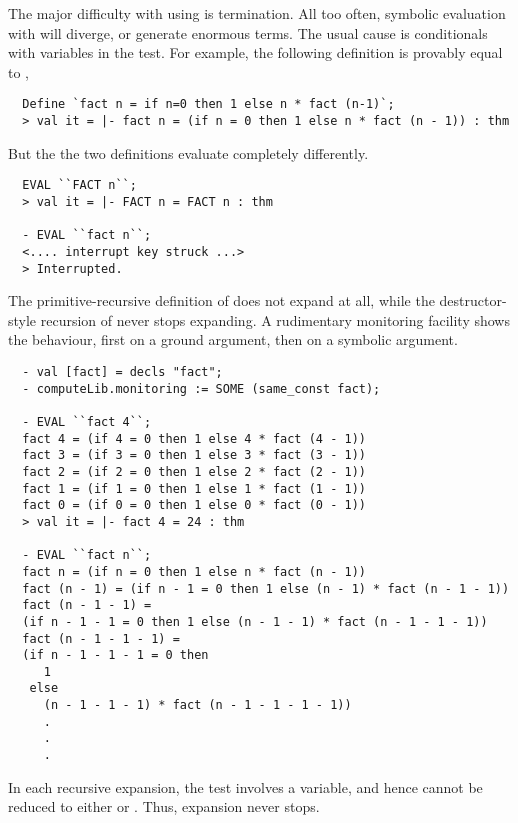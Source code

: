 {The major difficulty with using  is termination. All too
often, symbolic evaluation with  will diverge, or generate
enormous terms. The usual cause is conditionals with variables in the
test. For example, the following definition is provably equal to ,
%
\begin{session}
\begin{hol}
\begin{verbatim}
  Define `fact n = if n=0 then 1 else n * fact (n-1)`;
  > val it = |- fact n = (if n = 0 then 1 else n * fact (n - 1)) : thm
\end{verbatim}
\end{hol}
\end{session}
%
But the the two definitions evaluate completely differently.
%
\begin{session}
\begin{hol}
\begin{verbatim}
  EVAL ``FACT n``;
  > val it = |- FACT n = FACT n : thm

  - EVAL ``fact n``;
  <.... interrupt key struck ...>
  > Interrupted.
\end{verbatim}
\end{hol}
\end{session}
%
The primitive-recursive definition of  does not expand
at all, while the destructor-style recursion of  never stops
expanding. A rudimentary monitoring facility shows the behaviour, first
on a ground argument, then on a symbolic argument.
%
\begin{session}
\begin{hol}
\begin{verbatim}
  - val [fact] = decls "fact";
  - computeLib.monitoring := SOME (same_const fact);

  - EVAL ``fact 4``;
  fact 4 = (if 4 = 0 then 1 else 4 * fact (4 - 1))
  fact 3 = (if 3 = 0 then 1 else 3 * fact (3 - 1))
  fact 2 = (if 2 = 0 then 1 else 2 * fact (2 - 1))
  fact 1 = (if 1 = 0 then 1 else 1 * fact (1 - 1))
  fact 0 = (if 0 = 0 then 1 else 0 * fact (0 - 1))
  > val it = |- fact 4 = 24 : thm

  - EVAL ``fact n``;
  fact n = (if n = 0 then 1 else n * fact (n - 1))
  fact (n - 1) = (if n - 1 = 0 then 1 else (n - 1) * fact (n - 1 - 1))
  fact (n - 1 - 1) =
  (if n - 1 - 1 = 0 then 1 else (n - 1 - 1) * fact (n - 1 - 1 - 1))
  fact (n - 1 - 1 - 1) =
  (if n - 1 - 1 - 1 = 0 then
     1
   else
     (n - 1 - 1 - 1) * fact (n - 1 - 1 - 1 - 1))
     .
     .
     .
\end{verbatim}
\end{hol}
\end{session}
%
In each recursive expansion, the test involves a variable, and hence
cannot be reduced to either  or . Thus, expansion
never stops.

}
